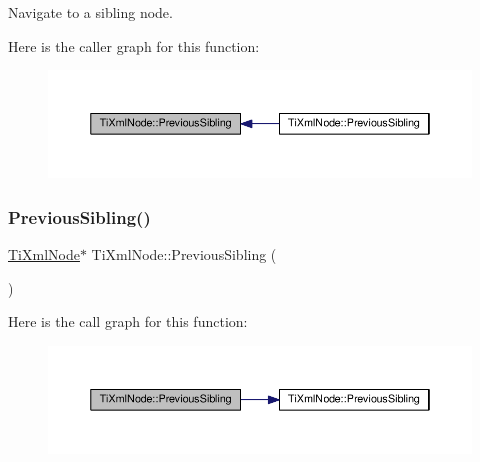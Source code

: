 Navigate to a sibling node. 

Here is the caller graph for this function\+:
\nopagebreak
\begin{figure}[H]
\begin{center}
\leavevmode
\includegraphics[width=350pt]{class_ti_xml_node_a8aacf06b1a577ff0d7cfa502cc76da32_icgraph}
\end{center}
\end{figure}
\mbox{\label{class_ti_xml_node_af8c0642ad6ecc03f62953e68896ed1cc}} 
\subsubsection{\texorpdfstring{Previous\+Sibling()}{PreviousSibling()}\hspace{0.1cm}{\footnotesize\ttfamily [2/4]}}
{\footnotesize\ttfamily \hyperlink{class_ti_xml_node}{Ti\+Xml\+Node}$\ast$ Ti\+Xml\+Node\+::\+Previous\+Sibling (\begin{DoxyParamCaption}{ }\end{DoxyParamCaption})\hspace{0.3cm}{\ttfamily [inline]}}

Here is the call graph for this function\+:
\nopagebreak
\begin{figure}[H]
\begin{center}
\leavevmode
\includegraphics[width=350pt]{class_ti_xml_node_af8c0642ad6ecc03f62953e68896ed1cc_cgraph}
\end{center}
\end{figure}
\mbox{\label{class_ti_xml_node_ace1b618fe58b2b9305fe89bfbc8dd17b}} 
